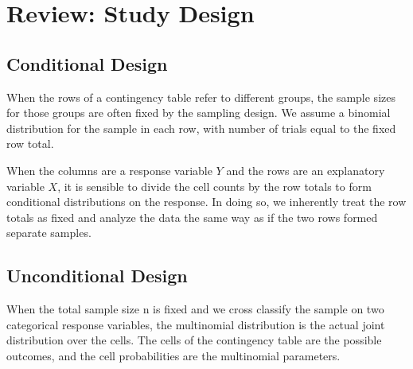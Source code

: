 \section{Review: Study Design}
\subsection{Conditional Design}
When the rows of a contingency table refer to different groups,
the sample sizes for those groups are often fixed by the sampling
design. We assume a binomial distribution for the sample in
each row, with number of trials equal to the fixed row total.

When the columns are a response variable $Y$ and the rows are
an explanatory variable $X$, it is sensible to divide the cell counts
by the row totals to form conditional distributions on the
response. In doing so, we inherently treat the row totals as fixed
and analyze the data the same way as if the two rows formed
separate samples.

\subsection{Unconditional Design}
When the total sample size n is fixed and we cross classify the
sample on two categorical response variables, the multinomial
distribution is the actual joint distribution over the cells. The
cells of the contingency table are the possible outcomes, and the
cell probabilities are the multinomial parameters.
